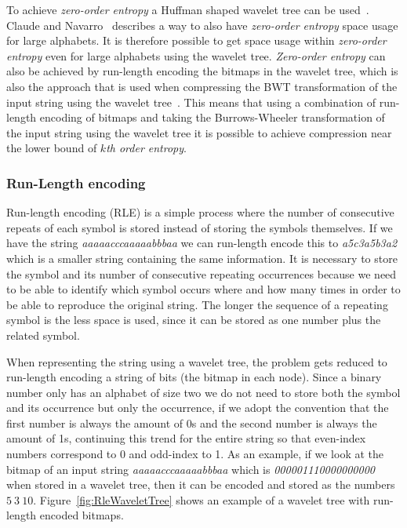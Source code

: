 To achieve \textit{zero-order entropy} a Huffman shaped wavelet tree can be used~\citep[Section~4]{FMcountOnBWT}. Claude and Navarro~\citep[Section~3]{Claude08practicalrankselect} describes a way to also have \textit{zero-order entropy} space usage for large alphabets. 
It is therefore possible to get space usage within \textit{zero-order entropy} even for large alphabets using the wavelet tree. 
\textit{Zero-order entropy} can also be achieved by run-length encoding the bitmaps in the wavelet tree, which is also the approach that is used when compressing the BWT transformation of the input string using the wavelet tree~\citep[Introduction (\textbf{B})]{waveletTreeEntropy}.
This means that using a combination of run-length encoding of bitmaps and taking the Burrows-Wheeler transformation of the input string using the wavelet tree it is possible to achieve compression near the lower bound of \textit{$k$th order entropy}.

\subsubsection{Run-Length encoding}
Run-length encoding (RLE) is a simple process where the number of consecutive repeats of each symbol is stored instead of storing the symbols themselves. 
If we have the string \textit{aaaaacccaaaaabbbaa} we can run-length encode this to \textit{a5c3a5b3a2} which is a smaller string containing the same information.
It is necessary to store the symbol and its number of consecutive repeating occurrences because we need to be able to identify which symbol occurs where and how many times in order to be able to reproduce the original string.
The longer the sequence of a repeating symbol is the less space is used, since it can be stored as one number plus the related symbol.

When representing the string using a wavelet tree, the problem gets reduced to run-length encoding a string of bits (the bitmap in each node).
Since a binary number only has an alphabet of size two we do not need to store both the symbol and its occurrence but only the occurrence, if we adopt the convention that the first number is always the amount of 0s and the second number is always the amount of 1s, continuing this trend for the entire string so that even-index numbers correspond to 0 and odd-index to 1. 
As an example, if we look at the bitmap of an input string \textit{aaaaacccaaaaabbbaa} which is \textit{000001110000000000} when stored in a wavelet tree, then it can be encoded and stored as the numbers $5~3~10$.
Figure~\ref{fig:RleWaveletTree} shows an example of a wavelet tree with run-length encoded bitmaps.

